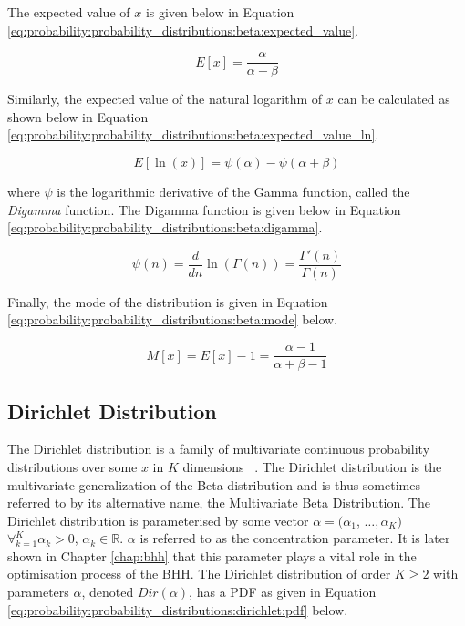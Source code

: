 The expected value of $x$ is given below in Equation \ref{eq:probability:probability_distributions:beta:expected_value}.

\begin{equation}
      \label{eq:probability:probability_distributions:beta:expected_value}
      E[x] = \frac{\alpha}{\alpha + \beta}
\end{equation}

Similarly, the expected value of the natural logarithm of $x$ can be calculated as shown below in Equation \ref{eq:probability:probability_distributions:beta:expected_value_ln}.

\begin{equation}
      \label{eq:probability:probability_distributions:beta:expected_value_ln}
      E[\ln(x)] = \psi({\alpha}) - \psi(\alpha + \beta)
\end{equation}

where $\psi$ is the logarithmic derivative of the Gamma function, called the \textit{Digamma} function. The Digamma function is given below in Equation \ref{eq:probability:probability_distributions:beta:digamma}.

\begin{equation}
      \label{eq:probability:probability_distributions:beta:digamma}
      \psi(n) = \frac{d}{dn}\ln(\Gamma(n)) = \frac{\Gamma'(n)}{\Gamma(n)}
\end{equation}

Finally, the mode of the distribution is given in Equation \ref{eq:probability:probability_distributions:beta:mode} below.

\begin{equation}
      \label{eq:probability:probability_distributions:beta:mode}
      M[x] = E[x] - 1 = \frac{\alpha - 1}{\alpha + \beta - 1}
\end{equation}










\subsection{Dirichlet Distribution}
\label{sec:probability:probability_distributions:dirichlet}


The Dirichlet distribution is a family of multivariate continuous probability distributions over some $x$ in $K$ dimensions ~\cite{ref:wackerly:2014}. The Dirichlet distribution is the multivariate generalization of the Beta distribution and is thus sometimes referred to by its alternative name, the Multivariate Beta Distribution. The Dirichlet distribution is parameterised by some vector $\alpha = (\alpha_{1}$,  $\dots, \alpha_{K})$ $\forall_{k=1}^{K} \alpha_{k} > 0$, $\alpha_{k} \in \mathbb{R}$. $\alpha$ is referred to as the concentration parameter. It is later shown in Chapter \ref{chap:bhh} that this parameter plays a vital role in the optimisation process of the \ac{BHH}. The Dirichlet distribution of order $K \geq 2$ with parameters $\alpha$, denoted $Dir(\alpha)$, has a \ac{PDF} as given in Equation \ref{eq:probability:probability_distributions:dirichlet:pdf} below.

